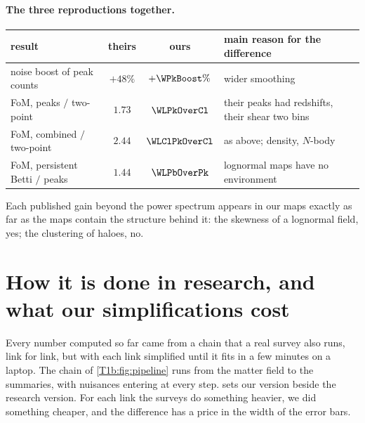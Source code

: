 \paragraph{The three reproductions together.}
\begin{center}
\small
\begin{tabular}{@{}p{4.3cm}ccp{4.2cm}@{}}
\toprule
result & theirs & ours & main reason for the difference\\\midrule
noise boost of peak counts & $+48\%$ & $+\WPkBoost\%$ & wider smoothing\\
FoM, peaks $/$ two-point & $1.73$ & $\WLPkOverCl$ & their peaks had redshifts, their shear two bins\\
FoM, combined $/$ two-point & $2.44$ & $\WLClPkOverCl$ & as above; density, $N$-body\\
FoM, persistent Betti $/$ peaks & $1.44$ & $\WLPbOverPk$ & lognormal maps have no environment\\
\bottomrule
\end{tabular}
\end{center}
Each published gain beyond the power spectrum appears in our maps exactly as far as the maps contain the structure
behind it: the skewness of a lognormal field, yes; the clustering of haloes, no.
\section{How it is done in research, and what our simplifications cost}
\label{12w:sec:research}

Every number computed so far came from a chain that a real survey also runs, link for link, but with each link
simplified until it fits in a few minutes on a laptop. The chain of \cref{T1b:fig:pipeline} runs from the matter
field to the summaries, with nuisances entering at every step.  sets our version beside the
research version. For each link the surveys do something heavier, we did something cheaper, and the difference has a
price in the width of the error bars.

